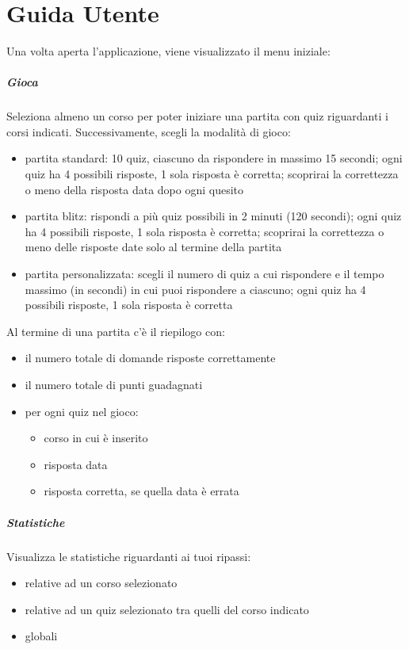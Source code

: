 \chapter{Guida Utente}
Una volta aperta l'applicazione, viene visualizzato il menu iniziale:

\paragraph{Gioca}
Seleziona almeno un corso per poter iniziare una partita con quiz riguardanti i corsi indicati.
Successivamente, scegli la modalità di gioco:
\begin{itemize}
    \item partita standard: 10 quiz, ciascuno da rispondere in massimo 15 secondi; ogni quiz ha 4 possibili risposte, 1 sola risposta è corretta; scoprirai la correttezza o meno della risposta data dopo ogni quesito
    \item partita blitz: rispondi a più quiz possibili in 2 minuti (120 secondi); ogni quiz ha 4 possibili risposte, 1 sola risposta è corretta; scoprirai la correttezza o meno delle risposte date solo al termine della partita
    \item partita personalizzata: scegli il numero di quiz a cui rispondere e il tempo massimo (in secondi) in cui puoi rispondere a ciascuno; ogni quiz ha 4 possibili risposte, 1 sola risposta è corretta
\end{itemize}

Al termine di una partita c'è il riepilogo con:
\begin{itemize}
    \item il numero totale di domande risposte correttamente
    \item il numero totale di punti guadagnati
    \item per ogni quiz nel gioco:
    \begin{itemize}
        \item corso in cui è inserito
        \item risposta data
        \item risposta corretta, se quella data è errata
    \end{itemize}
\end{itemize}

\paragraph{Statistiche}
Visualizza le statistiche riguardanti ai tuoi ripassi:
\begin{itemize}
    \item relative ad un corso selezionato
    \item relative ad un quiz selezionato tra quelli del corso indicato
    \item globali
\end{itemize}
 
